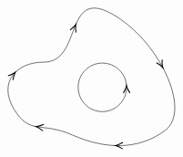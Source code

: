 \documentclass[12pt]{article}
\begin{document}
\begin{theorem}
\[\begin{tikzpicture}[x=0.75pt,y=0.75pt,yscale=-0.7,xscale=.7]
        \draw    (194.26,120.76) .. controls (252.26,120.76) and (224.42,9.55) .. (295.26,48) .. controls (366.09,86.45) and (416.73,192.41) .. (376.26,222.76) .. controls (335.78,253.12) and (285.26,250.76) .. (237.26,229.76) .. controls (189.26,208.76) and (173.26,230.64) .. (149.26,190.64) .. controls (125.26,150.64) and (153.26,120.51) .. (194.26,120.76) -- cycle ;
        \draw [shift={(242.18,64.55)}, rotate = 112.47] [color={rgb, 255:red, 0; green, 0; blue, 0 }  ][line width=0.75]    (10.93,-4.9) .. controls (6.95,-2.3) and (3.31,-0.67) .. (0,0) .. controls (3.31,0.67) and (6.95,2.3) .. (10.93,4.9)   ;
        \draw [shift={(372.72,128.93)}, rotate = 240.89] [color={rgb, 255:red, 0; green, 0; blue, 0 }  ][line width=0.75]    (10.93,-4.9) .. controls (6.95,-2.3) and (3.31,-0.67) .. (0,0) .. controls (3.31,0.67) and (6.95,2.3) .. (10.93,4.9)   ;
        \draw [shift={(301.73,245.48)}, rotate = 0.74] [color={rgb, 255:red, 0; green, 0; blue, 0 }  ][line width=0.75]    (10.93,-4.9) .. controls (6.95,-2.3) and (3.31,-0.67) .. (0,0) .. controls (3.31,0.67) and (6.95,2.3) .. (10.93,4.9)   ;
        \draw [shift={(182.71,217.06)}, rotate = 8.82] [color={rgb, 255:red, 0; green, 0; blue, 0 }  ][line width=0.75]    (10.93,-4.9) .. controls (6.95,-2.3) and (3.31,-0.67) .. (0,0) .. controls (3.31,0.67) and (6.95,2.3) .. (10.93,4.9)   ;
        \draw [shift={(151.34,135.99)}, rotate = 130.63] [color={rgb, 255:red, 0; green, 0; blue, 0 }  ][line width=0.75]    (10.93,-4.9) .. controls (6.95,-2.3) and (3.31,-0.67) .. (0,0) .. controls (3.31,0.67) and (6.95,2.3) .. (10.93,4.9)   ;
        \draw  [draw opacity=0] (318.31,158.43) .. controls (318.31,158.43) and (318.31,158.43) .. (318.31,158.43) .. controls (318.31,178.47) and (302.06,194.72) .. (282.02,194.72) .. controls (261.97,194.72) and (245.73,178.47) .. (245.73,158.43) .. controls (245.73,138.38) and (261.97,122.13) .. (282.02,122.13) .. controls (301.85,122.13) and (317.96,138.04) .. (318.3,157.79) -- (282.02,158.43) -- cycle ; \draw    (318.31,158.43) .. controls (318.31,158.43) and (318.31,158.43) .. (318.31,158.43) .. controls (318.31,178.47) and (302.06,194.72) .. (282.02,194.72) .. controls (261.97,194.72) and (245.73,178.47) .. (245.73,158.43) .. controls (245.73,138.38) and (261.97,122.13) .. (282.02,122.13) .. controls (301.25,122.13) and (316.99,137.1) .. (318.23,156.03) ; \draw [shift={(318.23,156.03)}, rotate = 89.02] [color={rgb, 255:red, 0; green, 0; blue, 0 }  ][line width=0.75]    (10.93,-4.9) .. controls (6.95,-2.3) and (3.31,-0.67) .. (0,0) .. controls (3.31,0.67) and (6.95,2.3) .. (10.93,4.9)   ; 

\end{tikzpicture}\]
\end{theorem}
\end{document}
